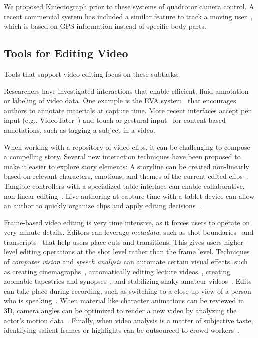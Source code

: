 We proposed Kinectograph prior to these systems of quadrotor camera control. A recent commercial system has included a similar feature to track a moving user~\cite{HexoDrone}, which is based on GPS information instead of specific body parts.


\subsection{Tools for Editing Video}
Tools that support video editing focus on these subtasks:

Researchers have investigated interactions that enable efficient, fluid annotation or labeling of video data. One example is the EVA system~\cite{Mackay:1989} that encourages authors to annotate materials at capture time. More recent interfaces accept pen input (e.g., VideoTater~\cite{Diakopoulos:2006vt}) and touch or gestural input~\cite{Sarkar:2016:SCC:2858036.2858199} for content-based annotations, such as tagging a subject in a video.

When working with a repository of video clips, it can be challenging to compose a compelling story. Several new interaction techniques have been proposed to make it easier to explore story elements:
%
A storyline can be created non-linearly based on relevant characters, emotions, and themes of the current edited clips~\cite{Shen:2009:WNE:1518701.1518825}.
%
Tangible controllers with a specialized table interface can enable collaborative, non-linear editing~\cite{Bartindale:2012:STS:2207676.2207700,Bartindale:2016:TSS:2818048.2819929}.
%
Live authoring at capture time with a tablet device can allow an author to quickly organize clips and apply editing decisions~\cite{Freeman:2014:LLA:2611105.2557304}.

Frame-based video editing is very time intensive, as it forces users to operate on very minute details. Editors can leverage \emph{metadata}, such as shot boundaries~\cite{Casares:2002dx} and transcripts~\cite{Berthouzoz:2012} that help users place cuts and transitions. This gives users higher-level editing operations at the shot level rather than the frame level.
%
Techniques of \emph{computer vision} and \emph{speech analysis} can automate certain visual effects, such as creating cinemagraphs~\cite{Bai:2012, Joshi:2012}, automatically editing lecture videos~\cite{Heck:2007}, creating zoomable tapestries and synopses~\cite{Barnes:2010,Pritch:2009vl}, and stabilizing shaky amateur videos~\cite{Liu:2011}.
%
Edits can take place during recording, such as switching to a close-up view of a person who is speaking~\cite{Ranjan:2010}.
%
When material like character animations can be reviewed in 3D, camera angles can be optimized to render a new video by analyzing the actor's motion data~\cite{assa2005action,assa2008motion}.
%
Finally, when video analysis is a matter of subjective taste, identifying salient frames or highlights can be outsourced to crowd workers~\cite{Bernstein:2011uj,Tang:2012:ECS:2207676.2208622}.

